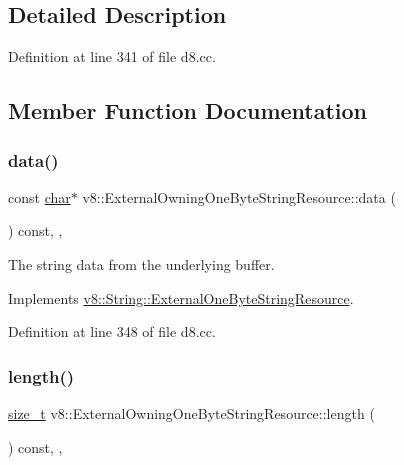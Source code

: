 \subsection{Detailed Description}


Definition at line 341 of file d8.\+cc.



\subsection{Member Function Documentation}
\mbox{\label{classv8_1_1ExternalOwningOneByteStringResource_a212c07a5f7faba9bd71544bdb6dbd321}} 
\subsubsection{\texorpdfstring{data()}{data()}}
{\footnotesize\ttfamily const \mbox{\hyperlink{classchar}{char}}$\ast$ v8\+::\+External\+Owning\+One\+Byte\+String\+Resource\+::data (\begin{DoxyParamCaption}{ }\end{DoxyParamCaption}) const\hspace{0.3cm}{\ttfamily [inline]}, {\ttfamily [override]}, {\ttfamily [virtual]}}

The string data from the underlying buffer. 

Implements \mbox{\hyperlink{classv8_1_1String_1_1ExternalOneByteStringResource_aaeca31240d3dbf990d1b974e3c64593e}{v8\+::\+String\+::\+External\+One\+Byte\+String\+Resource}}.



Definition at line 348 of file d8.\+cc.

\mbox{\label{classv8_1_1ExternalOwningOneByteStringResource_a162cec5c2469a2acf26efe384ceffe32}} 
\subsubsection{\texorpdfstring{length()}{length()}}
{\footnotesize\ttfamily \mbox{\hyperlink{classsize__t}{size\+\_\+t}} v8\+::\+External\+Owning\+One\+Byte\+String\+Resource\+::length (\begin{DoxyParamCaption}{ }\end{DoxyParamCaption}) const\hspace{0.3cm}{\ttfamily [inline]}, {\ttfamily [override]}, {\ttfamily [virtual]}}

